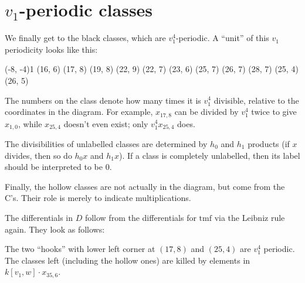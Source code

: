 \documentclass{shortart}
\newcommand\tmf{{\mathrm{tmf}}}
\begin{document}
\section{\texorpdfstring{$v_1$}{v1}-periodic classes}
We finally get to the black classes, which are $v_1^4$-periodic. A ``unit'' of this $v_1$ periodicity looks like this:
\begin{center}
  \begin{sseqpage}[Adams grading, classes=fill, scale=0.5, class labels = { left = 0cm }]
    \groupD(-8, -4){1}
    \classoptions["1"](16, 6)
    \classoptions["2"](17, 8)
    \classoptions["2"](19, 8)
    \classoptions["2"](22, 9)
    \classoptions["1"](22, 7)
    \classoptions["1"](23, 6)
    \classoptions["1"](25, 7)
    \classoptions["1"](26, 7)
    \classoptions["1"](28, 7)
    \classoptions["-1"](25, 4)
    \classoptions["0"](26, 5)
  \end{sseqpage}
\end{center}
The numbers on the class denote how many times it is $v_1^4$ divisible, relative to the coordinates in the diagram. For example, $x_{17, 8}$ can be divided by $v_1^4$ twice to give $x_{1, 0}$, while $x_{25, 4}$ doesn't even exist; only $v_1^4 x_{25, 4}$ does.

The divisibilities of unlabelled classes are determined by $h_0$ and $h_1$ products (if $x$ divides, then so do $h_0 x$ and $h_1 x$). If a class is completely unlabelled, then its label should be interpreted to be $0$.

Finally, the hollow classes are not actually in the diagram, but come from the C's.  Their role is merely to indicate multiplications.

The differentials in $D$ follow from the differentials for $\tmf$ via the Leibniz rule again. They look as follows:
\begin{center}
  \printpage[name = ddiff, page = 2]
\end{center}
\begin{center}
  \printpage[name = ddiff, page = 3]
\end{center}
\begin{center}
  \printpage[name = ddiff, page = 4]
\end{center}
\begin{center}
  \printpage[name = ddiff, page = 5]
\end{center}

The two ``hooks'' with lower left corner at $(17, 8)$ and $(25, 4)$ are $v_1^4$ periodic. The classes left (including the hollow ones) are killed by elements in $k[v_1, w] \cdot x_{35, 6}$.
\end{document}
